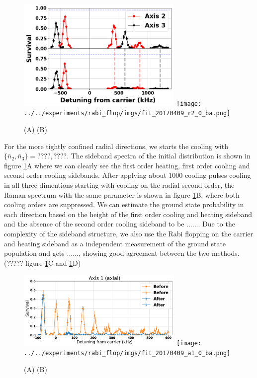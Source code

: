 \documentclass[aps,prl,twocolumn,groupedaddress]{revtex4-1}
\begin{document}
\begin{figure}
  \includegraphics[width=8cm]{imgs/spectrum_r.png}
  \texttt{[image: ../../experiments/rabi\_flop/imgs/fit\_20170409\_r2\_0\_ba.png]}
  \caption{(A) (B) \label{f-radial}}
\end{figure}

For the more tightly confined radial directions, we starts the cooling with $\{\bar n_2, \bar n_3\}=????, ????$. The sideband spectra of the initial distribution is shown in figure \ref{f-radial}A where we can clearly see the first order heating, first order cooling and second order cooling sidebands. After applying about 1000 cooling pulses cooling in all three dimentions starting with cooling on the radial second order, the Raman spectrum with the same parameter is shown in figure \ref{f-radial}B, where both cooling orders are suppressed. We can estimate the ground state probability in each direction based on the height of the first order cooling and heating sideband and the absence of the second order cooling sideband to be $......$. Due to the complexity of the sideband structure, we also use the Rabi flopping on the carrier and heating sideband as a independent measurement of the ground state population and gets $......$, showing good agreement between the two methods. (????? figure \ref{f-radial}C and \ref{f-radial}D)\\

\begin{figure}
  \includegraphics[width=8cm]{imgs/spectrum_a1.png}
  \texttt{[image: ../../experiments/rabi\_flop/imgs/fit\_20170409\_a1\_0\_ba.png]}
  \caption{(A) (B) \label{f-axial}}
\end{figure}
\end{document}
